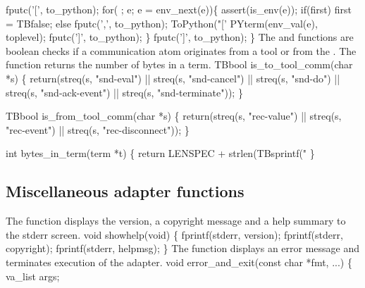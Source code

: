   fputc('[', to_python);
  for( ; e; e = env_next(e))\{
    assert(is_env(e));    
    if(first) first = TBfalse;
    else      fputc(',', to_python);
    ToPython("['%
    PYterm(env_val(e), toplevel);
    fputc(']', to_python);
  \}
  fputc(']', to_python);
\}
\nwendcode{}\nwdocspar
The  and 
functions are boolean checks if a communication atom originates from a
tool or from the \TB. The  function returns
the number of bytes in a term. 
\nwenddocs{}\plusendmoddef\nwstartdeflinemarkup{}\nwenddeflinemarkup
TBbool is_to_tool_comm(char *s) \{
  return(streq(s, "snd-eval") || streq(s, "snd-cancel") || 
         streq(s, "snd-do")   || streq(s, "snd-ack-event") ||
         streq(s, "snd-terminate"));
\}

TBbool is_from_tool_comm(char *s) \{
  return(streq(s, "rec-value") || streq(s, "rec-event") || 
         streq(s, "rec-disconnect"));
\}

int bytes_in_term(term *t) \{
  return LENSPEC + strlen(TBsprintf("%
\}
\nwendcode{}\nwdocspar


\subsection{Miscellaneous adapter functions}


The  function displays the version, a copyright
message and a help summary to the stderr screen.
\nwenddocs{}\endmoddef\nwstartdeflinemarkup{}\nwenddeflinemarkup
void showhelp(void) \{
  fprintf(stderr, version);
  fprintf(stderr, copyright);
  fprintf(stderr, helpmsg);
\}
\nwendcode{}\nwdocspar
The  function displays an error message and
terminates execution of the adapter.
\nwenddocs{}\plusendmoddef\nwstartdeflinemarkup{}\nwenddeflinemarkup
void error_and_exit(const char *fmt, ...) \{
  va_list args;

